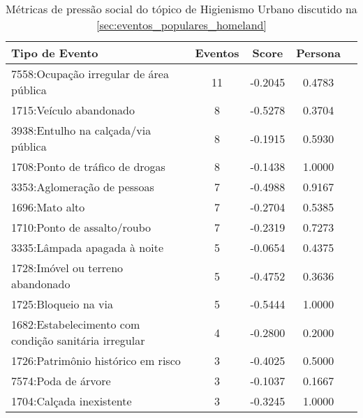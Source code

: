 \begin{table}[htbp]
	\centering
	\caption{Métricas de pressão social do tópico de Higienismo Urbano discutido na \autoref{sec:eventos_populares_homeland}}
	\label{tab:eventos_populares_homeland}
	\begin{tabular}{|l|c|c|c|c|}
		\hline
		\textbf{Tipo de Evento}                               & \textbf{Eventos} & \textbf{Score} & \textbf{Persona} \\
		\hline
		7558:Ocupação irregular de área pública               & 11               & -0.2045        & 0.4783           \\
		\hline
		1715:Veículo abandonado                               & 8                & -0.5278        & 0.3704           \\
		\hline
		3938:Entulho na calçada/via pública                   & 8                & -0.1915        & 0.5930           \\
		\hline
		1708:Ponto de tráfico de drogas                       & 8                & -0.1438        & 1.0000           \\
		\hline
		3353:Aglomeração de pessoas                           & 7                & -0.4988        & 0.9167           \\
		\hline
		1696:Mato alto                                        & 7                & -0.2704        & 0.5385           \\
		\hline
		1710:Ponto de assalto/roubo                           & 7                & -0.2319        & 0.7273           \\
		\hline
		3335:Lâmpada apagada à noite                          & 5                & -0.0654        & 0.4375           \\
		\hline
		1728:Imóvel ou terreno abandonado                     & 5                & -0.4752        & 0.3636           \\
		\hline
		1725:Bloqueio na via                                  & 5                & -0.5444        & 1.0000           \\
		\hline
		1682:Estabelecimento com condição sanitária irregular & 4                & -0.2800        & 0.2000           \\
		\hline
		1726:Patrimônio histórico em risco                    & 3                & -0.4025        & 0.5000           \\
		\hline
		7574:Poda de árvore                                   & 3                & -0.1037        & 0.1667           \\
		\hline
		1704:Calçada inexistente                              & 3                & -0.3245        & 1.0000           \\

\end{tabular}
\end{table}
